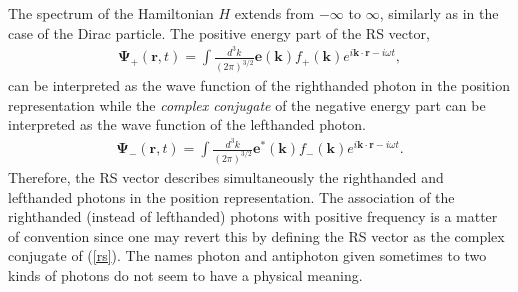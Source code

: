 \documentclass[twocolumn,aps,pra,10pt]{revtex4-1}
\begin{document}
The spectrum of the Hamiltonian $H$ extends from $-\infty$ to $\infty$, similarly as in the case of the Dirac particle. The positive energy part of the RS vector,
\begin{align}\label{plus}
{\bm \Psi}_+(\bm r,t)=\int\!\frac{d^3k}{(2\pi)^{3/2}}{\bm e}(\bm k)f_+(\bm k)e^{i\bm k\cdot\bm r-i\omega t},
\end{align}
can be interpreted as the wave function of the righthanded photon in the position representation while the {\em complex conjugate} of the negative energy part can be interpreted as the wave function of the lefthanded photon.
\begin{align}\label{min}
{\bm \Psi}_-(\bm r,t)=\int\!\frac{d^3k}{(2\pi)^{3/2}}{\bm e}^*(\bm k)f_-(\bm k)e^{i\bm k\cdot\bm r-i\omega t}.
\end{align}
Therefore, the RS vector describes simultaneously the righthanded and lefthanded photons in the position representation. The association of the righthanded (instead of lefthanded) photons with positive frequency is a matter of convention since one may revert this by defining the RS vector as the complex conjugate of (\ref{rs}). The names photon and antiphoton given sometimes \cite{ole} to two kinds of photons do not seem to have a physical meaning.
\end{document}
